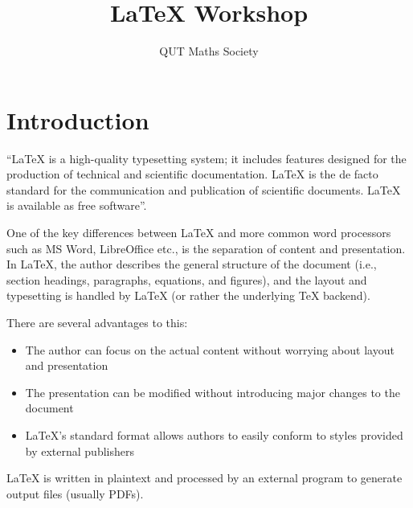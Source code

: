 \documentclass[11pt, twoside]{article}
\title{\LaTeX{} Workshop}
\author{QUT Maths Society}
\begin{document}

\maketitle


\tableofcontents

\listoffigures
\listoftables

\newpage
{}


\section{Introduction}
``\LaTeX{} is a high-quality typesetting system; it includes features designed for the production of technical and scientific documentation. \LaTeX{} is the de facto standard for the communication and publication of scientific documents. \LaTeX{} is available as free software''. \parencite{latex_project_latex}

One of the key differences between \LaTeX{} and more common word processors such as MS Word, LibreOffice etc., is the separation of content and presentation. In \LaTeX{}, the author describes the general structure of the document (i.e., section headings, paragraphs, equations, and figures), and the layout and typesetting is handled by \LaTeX{} (or rather the underlying \TeX{} backend).

There are several advantages to this:
\begin{itemize}
    \item The author can focus on the actual content without worrying about layout and presentation
    \item The presentation can be modified without introducing major changes to the document
    \item \LaTeX{}'s standard format allows authors to easily conform to styles provided by external publishers
\end{itemize}
\LaTeX{} is written in plaintext and processed by an external program to generate output files (usually PDFs).
\end{document}
